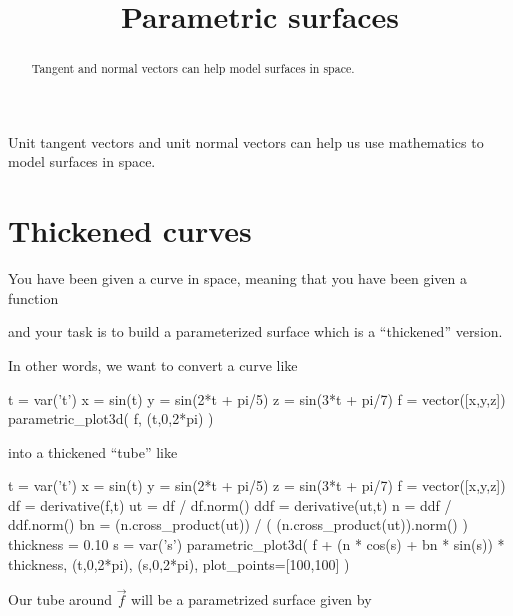 \documentclass{ximera}
\title[Dig-In:]{Parametric surfaces}
\begin{document}
\begin{abstract}
  Tangent and normal vectors can help model surfaces in space.
\end{abstract}
\maketitle

Unit tangent vectors and unit normal vectors can help us use
mathematics to model surfaces in space.

\section{Thickened curves}

\begin{example}
  You have been given a curve in space, meaning that you have been given a function
  \begin{multipleChoice}
  \end{multipleChoice}
  and your task is to build a parameterized surface which is a ``thickened'' version.

  In other words, we want to convert a curve like
  \begin{sageOutput}
t = var('t')
x = sin(t)
y = sin(2*t + pi/5)
z = sin(3*t + pi/7)
f = vector([x,y,z])
parametric_plot3d( f, (t,0,2*pi) )
  \end{sageOutput}
  into a thickened ``tube'' like
  \begin{sageOutput}
t = var('t')
x = sin(t)
y = sin(2*t + pi/5)
z = sin(3*t + pi/7)
f = vector([x,y,z])
df = derivative(f,t)
ut = df / df.norm()
ddf = derivative(ut,t)
n = ddf / ddf.norm()
bn = (n.cross_product(ut)) / ( (n.cross_product(ut)).norm() )
thickness = 0.10
s = var('s')
parametric_plot3d( f + (n * cos(s) + bn * sin(s)) * thickness, (t,0,2*pi), (s,0,2*pi), plot_points=[100,100] )
  \end{sageOutput}

  Our tube around $\vec{f}$ will be a parametrized surface given by 
  \begin{multipleChoice}
  \end{multipleChoice}


\end{example}
\end{document}
